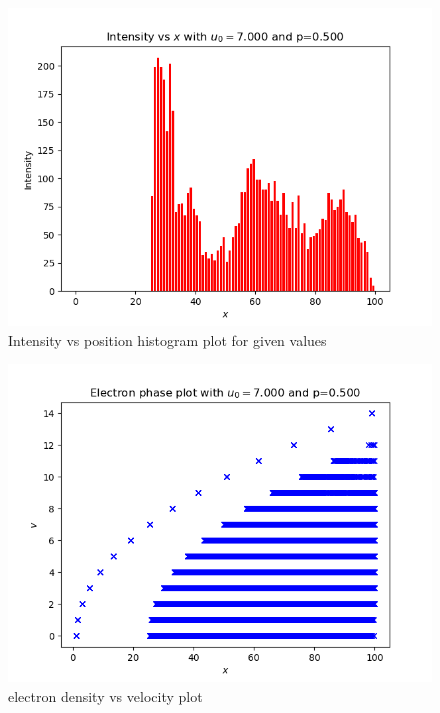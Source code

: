 \documentclass[11pt]{article}
\begin{document}
\begin{figure}[H]
    \centering
    \includegraphics[scale = 1]{3_b.png}
    \caption{Intensity vs position histogram plot for given values}
\end{figure}

\begin{figure}[H]
    \centering
    \includegraphics[scale = 1]{3_c.png}
    \caption{electron density vs velocity plot}
\end{figure}
\end{document}
